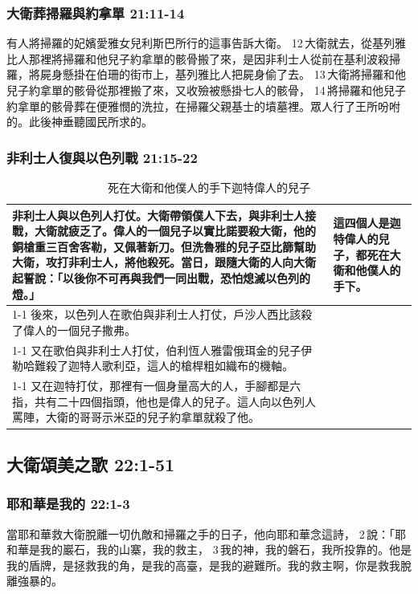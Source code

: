 \subsubsection{大衛葬掃羅與約拿單 21:11-14}
有人將掃羅的妃嬪愛雅女兒利斯巴所行的這事告訴大衛。 12 大衛就去，從基列雅比人那裡將掃羅和他兒子約拿單的骸骨搬了來，是因非利士人從前在基利波殺掃羅，將屍身懸掛在伯珊的街市上，基列雅比人把屍身偷了去。 13 大衛將掃羅和他兒子約拿單的骸骨從那裡搬了來，又收殮被懸掛七人的骸骨， 14 將掃羅和他兒子約拿單的骸骨葬在便雅憫的洗拉，在掃羅父親基士的墳墓裡。眾人行了王所吩咐的。此後神垂聽國民所求的。

\subsubsection{非利士人復與以色列戰 21:15-22}
\begin{table}[H]
\centering 
\begin{tabular}{p{}|p{1.45cm}}\hline\hline
非利士人與以色列人打仗。大衛帶領僕人下去，與非利士人接戰，大衛就疲乏了。偉人的一個兒子以實比諾要殺大衛，他的銅槍重三百舍客勒，又佩著新刀。但洗魯雅的兒子亞比篩幫助大衛，攻打非利士人，將他殺死。當日，跟隨大衛的人向大衛起誓說：「以後你不可再與我們一同出戰，恐怕熄滅以色列的燈。」&\multirow{4}{1.55cm}{這四個人是迦特偉人的兒子，都死在大衛和他僕人的手下。}\\\cline{1-1}
後來，以色列人在歌伯與非利士人打仗，戶沙人西比該殺了偉人的一個兒子撒弗。&\\\cline{1-1}
又在歌伯與非利士人打仗，伯利恆人雅雷俄珥金的兒子伊勒哈難殺了迦特人歌利亞，這人的槍桿粗如織布的機軸。&\\\cline{1-1}
又在迦特打仗，那裡有一個身量高大的人，手腳都是六指，共有二十四個指頭，他也是偉人的兒子。這人向以色列人罵陣，大衛的哥哥示米亞的兒子約拿單就殺了他。&\\\hline
\end{tabular}
\caption{死在大衛和他僕人的手下迦特偉人的兒子}
\end{table}

\subsection{大衛頌美之歌 22:1-51}
\subsubsection{耶和華是我的 22:1-3}
當耶和華救大衛脫離一切仇敵和掃羅之手的日子，他向耶和華念這詩， 2 說：「耶和華是我的巖石，我的山寨，我的救主， 3 我的神，我的磐石，我所投靠的。他是我的盾牌，是拯救我的角，是我的高臺，是我的避難所。我的救主啊，你是救我脫離強暴的。

